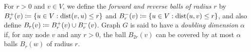 For $r>0$ and $v\in V$, we define the \emph{forward and reverse balls of radius $r$} by $B^+_r(v)\coloneqq\{u\in V: \mbox{dist}(v,u)\leq r\}$ and $B^-_r(v)\coloneqq\{u\in V: \mbox{dist}(u,v)\leq r\}$, and also define $B_r(v)\coloneqq B^+_r(v)\cup B^-_r(v)$.
Graph $G$ is said to have a \emph{doubling dimension} $\alpha$ if, for any node $v$ and any $r>0$, the ball $B_{2r}(v)$ can be covered by at most $\alpha$ balls $B_r(w)$ of radius $r$. 